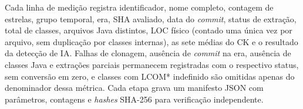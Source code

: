 Cada linha de medição registra identificador, nome completo, contagem de estrelas, grupo temporal, era, SHA avaliado, data do \emph{commit}, status de extração, total de classes, arquivos Java distintos, LOC físico (contado uma única vez por arquivo, sem duplicação por classes internas), as sete médias do CK e o resultado da detecção de IA. Falhas de clonagem, ausência de \emph{commit} na era, ausência de classes Java e extrações parciais permanecem registradas com o respectivo status, sem conversão em zero, e classes com LCOM* indefinido são omitidas apenas do denominador dessa métrica. Cada etapa grava um manifesto JSON com parâmetros, contagens e \emph{hashes} SHA-256 para verificação independente.
